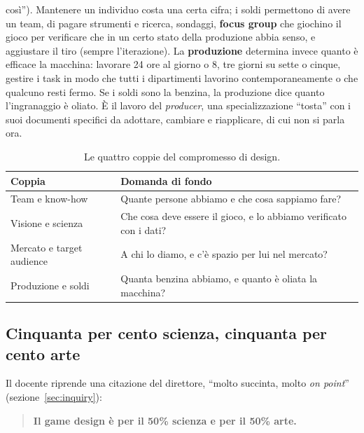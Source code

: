 \begin{description}
        così''). Mantenere un individuo costa una certa cifra; i soldi
        permettono di avere un team, di pagare strumenti e ricerca, sondaggi,
        \textbf{focus group} che giochino il gioco per verificare che in un
        certo stato della produzione abbia senso, e aggiustare il tiro (sempre
        l'iterazione). La \textbf{produzione} determina invece quanto è
        efficace la macchina: lavorare 24 ore al giorno o 8, tre giorni su
        sette o cinque, gestire i task in modo che tutti i dipartimenti
        lavorino contemporaneamente o che qualcuno resti fermo. Se i soldi
        sono la benzina, la produzione dice quanto l'ingranaggio è oliato. È
        il lavoro del \emph{producer}, una specializzazione ``tosta'' con i
        suoi documenti specifici da adottare, cambiare e riapplicare, di cui
        non si parla ora.
\end{description}

\begin{table}[htbp]
  \centering
  \caption{Le quattro coppie del compromesso di design.}
  \label{tab:compromesso}
  \begin{tabular}{@{}p{}p{}@{}}
    \toprule
    \textbf{Coppia} & \textbf{Domanda di fondo} \\
    \midrule
    Team e know-how & Quante persone abbiamo e che cosa sappiamo fare? \\
    Visione e scienza & Che cosa deve essere il gioco, e lo abbiamo
                        verificato con i dati? \\
    Mercato e target audience & A chi lo diamo, e c'è spazio per lui nel
                                mercato? \\
    Produzione e soldi & Quanta benzina abbiamo, e quanto è oliata la
                         macchina? \\
    \bottomrule
  \end{tabular}
\end{table}

\subsection{Cinquanta per cento scienza, cinquanta per cento arte}

Il docente riprende una citazione del direttore, ``molto succinta, molto
\emph{on point}'' (sezione~\ref{sec:inquiry}):

\begin{quote}
\centering
\textbf{Il game design è per il 50\% scienza e per il 50\% arte.}
\end{quote}

